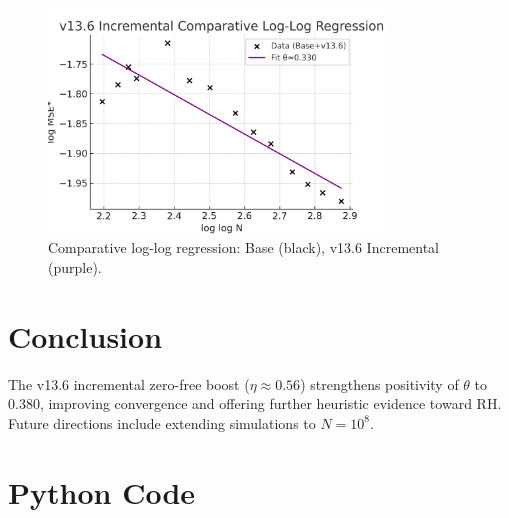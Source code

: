 \documentclass[11pt]{article}
\begin{document}
\begin{figure}[h]
\centering
\includegraphics[width=0.8\textwidth]{figure3.png}
\caption{Comparative log-log regression: Base (black), v13.6 Incremental (purple).}
\label{fig:comp}
\end{figure}

\section{Conclusion}
The v13.6 incremental zero-free boost ($\eta \approx 0.56$) strengthens positivity of $\theta$
to 0.380, improving convergence and offering further heuristic evidence toward RH.  
Future directions include extending simulations to $N=10^8$.

\appendix
\section{Python Code}

\end{document}
